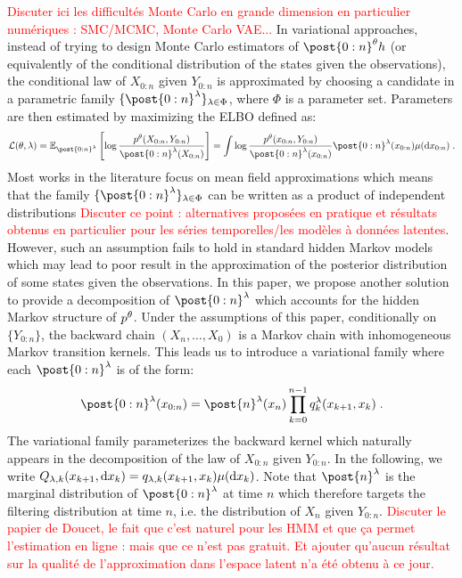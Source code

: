 \documentclass{article}
\begin{document}
\textcolor{red}{Discuter ici les difficult\'es Monte Carlo en grande dimension en particulier num\'eriques : SMC/MCMC, Monte Carlo VAE...}
In variational approaches, instead of trying to design Monte Carlo estimators of $\post{0:n}^{\parvec} h$ (or equivalently of the conditional distribution of the states given the observations), the conditional law of $X_{0:n}$ given $Y_{0:n}$ is approximated by choosing a candidate in a parametric family $\{ \post{0:n}^{\parvar}\}_{\parvar \in \Phi}$, where $\Phi$ is a parameter set. Parameters are then estimated by maximizing the ELBO defined as:
$$
\mathcal{L}(\parvec,\parvar) = \pE_{ \post{0:n}^{\parvar}}\left[\log \frac{p^\parvec(X_{0:n},Y_{0:n})}{ \post{0:n}^{\parvar}(X_{0:n})}\right] = \int \log \frac{p^\parvec(x_{0:n},Y_{0:n})}{ \post{0:n}^{\parvar}(x_{0:n})} \post{0:n}^{\parvar}(x_{0:n})\mu(\rmd x_{0:n})\eqsp.
$$
Most works in the literature focus on mean field approximations which means that the family $\{ \post{0:n}^{\parvar}\}_{\parvar \in \Phi}$ can be written as a product of independent distributions \textcolor{red}{Discuter ce point : alternatives propos\'ees en pratique et r\'esultats obtenus en particulier pour les s\'eries temporelles/les mod\`eles \`a donn\'ees latentes}. However, such an assumption fails to hold in standard hidden Markov models which may lead to poor result in the approximation of the posterior distribution of some states given the observations. In this paper, we propose another solution to provide a decomposition of   $ \post{0:n}^{\parvar}$ which accounts for the hidden Markov structure of $p^{\theta}$. Under the assumptions of this paper, conditionally on $\{Y_{0:n}\}$, the backward chain $(X_n,\ldots,X_0)$ is a Markov chain with inhomogeneous Markov transition kernels. This leads us to introduce a variational family where each $\post{0:n}^{\parvar}$ is of the form:
$$
 \post{0:n}^{\parvar}(x_{0:n})=  \post{n}^{\parvar}(x_n)\prod_{k=0}^{n-1}q_{k}^{\parvar}(x_{k+1},x_k)\eqsp.
$$
The variational family parameterizes the backward kernel which naturally appears in the decomposition of the law of $X_{0:n}$ given $Y_{0:n}$. In the following, we write $Q_{\lambda,k}(x_{k+1}, \mathrm{d} x_k) = q_{\lambda,k}(x_{k+1},x_k) \mu(\mathrm{d} x_k)$. Note that $ \post{n}^{\parvar}$ is the marginal distribution of $ \post{0:n}^{\parvar}$ at time $n$ which therefore targets the filtering distribution at time $n$, i.e. the distribution of $X_n$ given $Y_{0:n}$.
\textcolor{red}{Discuter le papier de Doucet, le fait que c'est naturel pour les HMM et que \c ca permet l'estimation en ligne : mais que ce n'est pas gratuit. Et ajouter qu'aucun r\'esultat sur la qualit\'e de l'approximation dans l'espace latent n'a \'et\'e obtenu \`a ce jour.}
\end{document}
